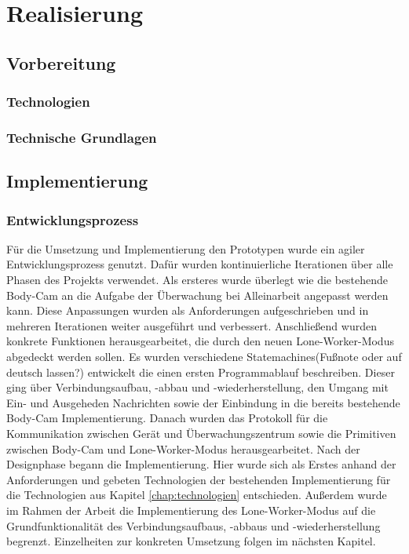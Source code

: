 \documentclass[thesis.tex]{subfiles}
\begin{document}
\chapter{Realisierung}\label{chap:realisierung}

\section{Vorbereitung}
\subsection{Technologien}\label{chap:technologien}
\subsection{Technische Grundlagen}
\section{Implementierung}
\subsection{Entwicklungsprozess}

Für die Umsetzung und Implementierung den Prototypen wurde ein agiler Entwicklungsprozess genutzt.
Dafür wurden kontinuierliche Iterationen über alle Phasen des Projekts verwendet.
Als ersteres wurde überlegt wie die bestehende Body-Cam an die Aufgabe der Überwachung bei Alleinarbeit angepasst werden kann.
Diese Anpassungen wurden als Anforderungen aufgeschrieben und in mehreren Iterationen weiter ausgeführt und verbessert.
Anschließend wurden konkrete Funktionen herausgearbeitet, die durch den neuen Lone-Worker-Modus abgedeckt werden sollen.
Es wurden verschiedene Statemachines(Fußnote oder auf deutsch lassen?) entwickelt die einen ersten Programmablauf beschreiben.
Dieser ging über Verbindungsaufbau, -abbau und -wiederherstellung, den Umgang mit Ein- und Ausgeheden Nachrichten sowie der Einbindung in die bereits bestehende Body-Cam Implementierung.
Danach wurden das Protokoll für die Kommunikation zwischen Gerät und Überwachungszentrum sowie die Primitiven zwischen Body-Cam und Lone-Worker-Modus herausgearbeitet.
Nach der Designphase begann die Implementierung.
Hier wurde sich als Erstes anhand der Anforderungen und gebeten Technologien der bestehenden Implementierung für die Technologien aus Kapitel \autoref{chap:technologien} entschieden.
Außerdem wurde im Rahmen der Arbeit die Implementierung des Lone-Worker-Modus auf die Grundfunktionalität des Verbindungsaufbaus, -abbaus und -wiederherstellung begrenzt.
Einzelheiten zur konkreten Umsetzung folgen im nächsten Kapitel.
\\
\end{document}
